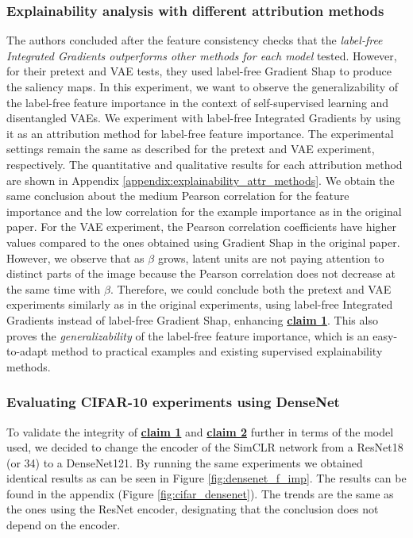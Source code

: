 \subsubsection{Explainability analysis with different attribution methods}


The authors concluded after the feature consistency checks that the \textit{label-free Integrated Gradients outperforms other methods for each model} tested. However, for their pretext and VAE tests, they used label-free Gradient Shap to produce the saliency maps. In this experiment, we want to observe the generalizability of the label-free feature importance in the context of self-supervised learning and disentangled VAEs. We experiment with label-free Integrated Gradients by using it as an attribution method for label-free feature importance. The experimental settings remain the same as described for the pretext and VAE experiment, respectively. The quantitative and qualitative results for each attribution method are shown in Appendix \ref{appendix:explainability_attr_methods}. We obtain the same conclusion about the medium Pearson correlation for the feature importance and the low correlation for the example importance as in the original paper. For the VAE experiment, the Pearson correlation coefficients have higher values compared to the ones obtained using Gradient Shap in the original paper. However, we observe that as \( \beta \) grows, latent units are not paying attention to distinct parts of the image because the Pearson correlation does not decrease at the same time with \(\beta\). Therefore, we could conclude both the pretext and VAE experiments similarly as in the original experiments, using label-free Integrated Gradients instead of label-free Gradient Shap, enhancing \textbf{\hyperref[claim1]{claim 1}}. This also proves the \textit{generalizability} of the label-free feature importance, which is an easy-to-adapt method to practical examples and existing supervised explainability methods.

\subsubsection{Evaluating CIFAR-10 experiments using DenseNet}
 
 To validate the integrity of \textbf{\hyperref[claim1]{claim 1}} and \textbf{\hyperref[claim2]{claim 2}} further in terms of the model used, we decided to change the encoder of the SimCLR network from a ResNet18 (or 34) to a DenseNet121. By running the same experiments we obtained identical results as can be seen in Figure \ref{fig:densenet_f_imp}. The results can be found in the appendix (Figure \ref{fig:cifar_densenet}). The trends are the same as the ones using the ResNet encoder, designating that the conclusion does not depend on the encoder.
 

